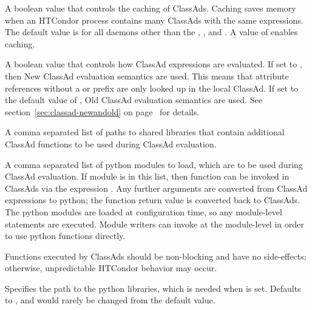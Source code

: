 \begin{description}
\label{param:EnableClassadCaching}
\item[\Macro{ENABLE\_CLASSAD\_CACHING}]
  A boolean value that controls the caching of ClassAds.
  Caching saves memory when an HTCondor process contains
  many ClassAds with the same expressions.
  The default value is  for all daemons other than the
  , , and .
  A value of  enables caching.

\label{param:StrictClassadEvaluation}
\item[\Macro{STRICT\_CLASSAD\_EVALUATION}]
  A boolean value that controls how ClassAd expressions are evaluated. 
  If set to , then New ClassAd evaluation semantics are used.
  This means that attribute references without a  or
   prefix are only looked up in the local ClassAd.
  If set to the default value of , 
  Old ClassAd evaluation semantics are used.
  See section~\ref{sec:classad-newandold}  on
  page~\pageref{sec:classad-newandold} for details.

\label{param:ClassadUserLibs}
\item[\Macro{CLASSAD\_USER\_LIBS}]
  A comma separated list of paths to shared libraries that contain
  additional ClassAd functions to be used during ClassAd evaluation.

\label{param:ClassadUserPythonModules}
\item[\Macro{CLASSAD\_USER\_PYTHON\_MODULES}]
  A comma separated list of python modules to load, 
  which are to be used during ClassAd evaluation.  
  If module  is in this list, then function 
  can be invoked in ClassAds via the expression 
  .
  Any further arguments are converted from ClassAd expressions to python; 
  the function return value is converted back to ClassAds.
  The python modules are loaded at configuration time, 
  so any module-level statements are executed.  
  Module writers can invoke  at the module-level
  in order to use python functions directly.

  Functions executed by ClassAds should be non-blocking and have 
  no side-effects;
  otherwise, unpredictable HTCondor behavior may occur.

\label{param:ClassadUserPythonLib}
\item[\Macro{CLASSAD\_USER\_PYTHON\_LIB}]
  Specifies the path to the python libraries,
  which is needed when  is set.
  Defaults to ,
  and would rarely be changed from the default value.


\end{description}
